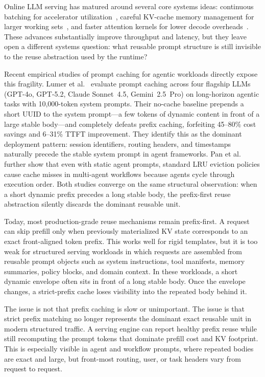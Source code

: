 \documentclass[conference]{IEEEtran}
\begin{document}
Online LLM serving has matured around several core systems ideas: continuous batching for accelerator utilization~\cite{yu2022orca}, careful KV-cache memory management for larger working sets~\cite{kwon2023efficient}, and faster attention kernels for lower decode overheads~\cite{dao2022flashattention,dao2023flashattention2}. These advances substantially improve throughput and latency, but they leave open a different systems question: what reusable prompt structure is still invisible to the reuse abstraction used by the runtime?

Recent empirical studies of prompt caching for agentic workloads directly expose this fragility. Lumer et al.~\cite{lumer2026dontbreak} evaluate prompt caching across four flagship LLMs (GPT-4o, GPT-5.2, Claude Sonnet~4.5, Gemini~2.5~Pro) on long-horizon agentic tasks with 10{,}000-token system prompts. Their no-cache baseline prepends a short UUID to the system prompt---a few tokens of dynamic content in front of a large stable body---and completely defeats prefix caching, forfeiting 45--80\% cost savings and 6--31\% TTFT improvement. They identify this as the dominant deployment pattern: session identifiers, routing headers, and timestamps naturally precede the stable system prompt in agent frameworks. Pan et al.~\cite{pan2025kvflow} further show that even with static agent prompts, standard LRU eviction policies cause cache misses in multi-agent workflows because agents cycle through execution order. Both studies converge on the same structural observation: when a short dynamic prefix precedes a long stable body, the prefix-first reuse abstraction silently discards the dominant reusable unit.

Today, most production-grade reuse mechanisms remain prefix-first. A request can skip prefill only when previously materialized KV state corresponds to an exact front-aligned token prefix. This works well for rigid templates, but it is too weak for structured serving workloads in which requests are assembled from reusable prompt objects such as system instructions, tool manifests, memory summaries, policy blocks, and domain context. In these workloads, a short dynamic envelope often sits in front of a long stable body. Once the envelope changes, a strict-prefix cache loses visibility into the repeated body behind it.

The issue is not that prefix caching is slow or unimportant. The issue is that strict prefix matching no longer represents the dominant exact reusable unit in modern structured traffic. A serving engine can report healthy prefix reuse while still recomputing the prompt tokens that dominate prefill cost and KV footprint. This is especially visible in agent and workflow prompts, where repeated bodies are exact and large, but front-most routing, user, or task headers vary from request to request.
\end{document}
